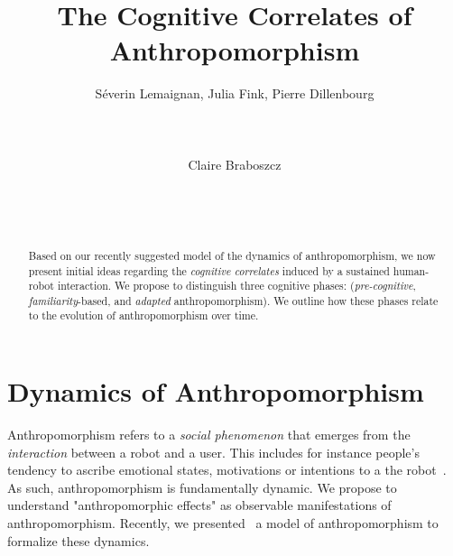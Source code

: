\documentclass{sig-alternate-2013}
\begin{document}
\title{The Cognitive Correlates of Anthropomorphism}

\author{
\alignauthor
Séverin Lemaignan, Julia Fink, Pierre Dillenbourg\\
    \\
    \\
    \\
\alignauthor
Claire Braboszcz\\
    \\
    \\
    \\
}

\maketitle

\begin{abstract}

Based on our recently suggested model of the dynamics of anthropomorphism, we now
present initial ideas regarding the \emph{cognitive
correlates} induced by a sustained human-robot interaction. We
propose to distinguish three cognitive phases: (\emph{pre-cognitive},
\emph{familiarity}-based, and \emph{adapted}
anthropomorphism). We outline how these phases relate to the evolution of
anthropomorphism over time.

\end{abstract}

\section{Dynamics of Anthropomorphism}
\label{sec:dynamics_model}

Anthropomorphism refers to a \emph{social
phenomenon} that emerges from the \emph{interaction} between a robot and a
user. This includes for
instance people's tendency to ascribe emotional states, motivations or intentions to
a the robot~\cite{epley_when_2008}. As such, anthropomorphism is fundamentally dynamic.
We propose to understand "anthropomorphic effects" as observable manifestations of anthropomorphism.
Recently, we presented~\cite{lemaignan2014dynamics} a model of
anthropomorphism to formalize these dynamics.
\end{document}
